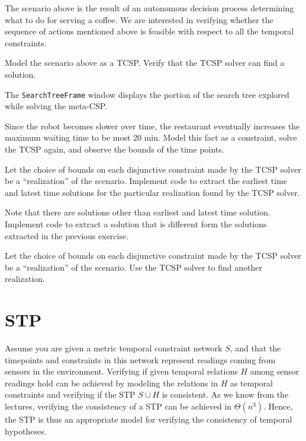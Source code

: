 \documentclass[a4paper]{article}
\begin{document}
The scenario above is the result of an autonomous decision process determining what to do for serving a coffee. We are interested in verifying whether the sequence of actions mentioned above is feasible with respect to all the temporal constraints.

{\ex{}\label{ex:ex1}  
Model the scenario above as a TCSP. Verify that the TCSP solver can find a solution.
\vspace{0.1cm}}

The {\tt SearchTreeFrame} window displays the portion of the search tree explored while solving the meta-CSP.

{\ex{}\label{ex:ex2}
Since the robot becomes slower over time, the restaurant eventually increases the maximum waiting time to be most 20 min. Model this fact as a constraint, solve the TCSP again, and observe the bounds of the time points.
\vspace{0.1cm}}

{\ex{}\label{ex:ex3}
Let the choice of bounds on each disjunctive constraint made by the TCSP solver be a ``realization'' of the scenario.  Implement code to extract the earliest time and latest time solutions for the particular realization found by the TCSP solver.
\vspace{0.1cm}}

{\ex{}\label{ex:ex4}
Note that there are solutions other than earliest and latest time solution. Implement code to extract a solution that is different form the solutions extracted in the previous exercise.
\vspace{0.1cm}}

{\ex{}\label{ex:ex5}
Let the choice of bounds on each disjunctive constraint made by the TCSP solver be a ``realization'' of the scenario.  Use the TCSP solver to find another realization.
\vspace{0.1cm}}


\section{STP}

Assume you are given a metric temporal constraint network $S$, and that the timepoints and constraints in this network represent readings coming from sensors in the environment.  Verifying if given temporal relations $H$ among sensor readings hold can be achieved by modeling the relations in $H$ as temporal constraints and verifying if the STP $S \cup H$ is consistent.  As we know from the lectures, verifying the consistency of a STP can be achieved in $\Theta(n^3)$.  Hence, the STP is thus an appropriate model for verifying the consistency of temporal hypotheses.

%
%
\end{document}
